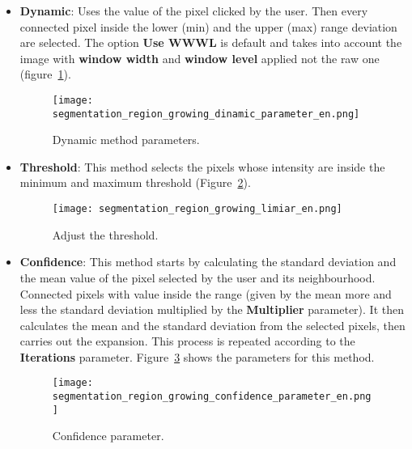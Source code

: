\begin{itemize}
	\item \textbf{Dynamic}: Uses the value of the pixel clicked by the user. Then every connected pixel inside the lower (min) and the upper (max) range deviation are selected. The option \textbf{Use WWWL} is default and takes into account the image with \textbf{window width} and \textbf{window level} applied not the raw one (figure~\ref{fig:segmentation_region_growing_dinamic_parameter}).

	\begin{figure}[!htb]
	\centering
	\texttt{[image: segmentation\_region\_growing\_dinamic\_parameter\_en.png]}
	\caption{Dynamic method parameters.}
	\label{fig:segmentation_region_growing_dinamic_parameter}
	\end{figure}

	\item \textbf{Threshold}: This method selects the pixels whose intensity are inside the minimum and maximum threshold (Figure~\ref{fig:segmentation_region_growing_limiar}).

	\begin{figure}[!htb]
	\centering
	\texttt{[image: segmentation\_region\_growing\_limiar\_en.png]}
    \caption{Adjust the threshold.}
	\label{fig:segmentation_region_growing_limiar}
	\end{figure}

    \item \textbf{Confidence}: This method starts by calculating the standard deviation and the mean value of the pixel selected by the user and its neighbourhood. Connected pixels with value inside the range (given by the mean more and less the standard deviation multiplied by the \textbf{Multiplier} parameter). It then calculates the mean and the standard deviation from the selected pixels, then carries out the expansion.  This process is repeated according to the \textbf{Iterations} parameter. Figure~\ref{fig:segmentation_region_growing_confidence_parameter} shows the parameters for this method.

	\begin{figure}[!htb]
	\centering
	\texttt{[image: segmentation\_region\_growing\_confidence\_parameter\_en.png]}
    \caption{Confidence parameter.}
	\label{fig:segmentation_region_growing_confidence_parameter}
	\end{figure}


\end{itemize}
